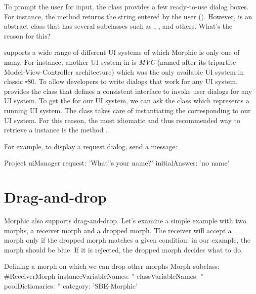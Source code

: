 \documentclass[a4paper,10pt,twoside]{book}
\begin{document}
To prompt the user for input, the  class provides a few ready-to-use dialog boxes.
For instance, the  method returns the string entered by the user ().
However,  is an abstract class that has several subclasses such as , , and others.
What's the reason for this?

\sq supports a wide range of different UI systems of which Morphic is only one of many.
For instance, another UI system in \sq is \emph{MVC} (named after its tripartite Model-View-Controller architecture) which was the only available UI system in classic \st-80.
To allow developers to write dialogs that work for any UI system, \sq provides the  class that defines a consistent interface to invoke user dialogs for any UI system.
To get the  for our UI system, we can ask the class  which represents a running UI system.
The class  takes care of instantiating the  corresponding to our UI system.
For this reason, the most idiomatic and thus recommended way to retrieve a  instance is the method .

For example, to display a request dialog, send a  message:
\begin{code}{}
Project uiManager
	request: 'What''s your name?'
	initialAnswer: 'no name'
\end{code}

\section{Drag-and-drop}

Morphic also supports drag-and-drop. Let's examine a simple example with two morphs, a receiver morph and a dropped morph. 
The receiver will accept a morph only if the dropped morph matches a given condition: in our example,  the morph should be blue. If it is rejected, the dropped morph decides what to do.

\begin{classdef}{Defining a morph on which we can drop other morphs}
Morph subclass: #ReceiverMorph
	instanceVariableNames: ''
	classVariableNames: ''
	poolDictionaries: ''
	category: 'SBE-Morphic'
\end{classdef}
\end{document}
